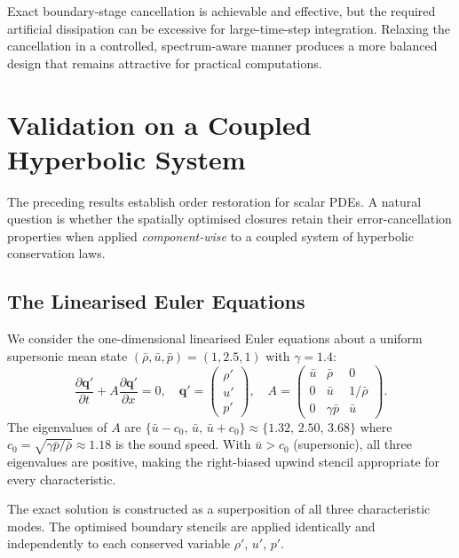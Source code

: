 \documentclass[review,hidelinks,onefignum,onetabnum]{siamart251216}
\begin{document}
Exact boundary-stage cancellation is achievable and effective, but the required artificial dissipation can be excessive for large-time-step integration. Relaxing the cancellation in a controlled, spectrum-aware manner produces a more balanced design that remains attractive for practical computations.

\section{Validation on a Coupled Hyperbolic System} \label{sec:euler}

The preceding results establish order restoration for scalar PDEs. A natural question is whether the spatially optimised closures retain their error-cancellation properties when applied \emph{component-wise} to a coupled system of hyperbolic conservation laws.

\subsection{The Linearised Euler Equations}

We consider the one-dimensional linearised Euler equations about a uniform supersonic mean state $(\bar{\rho}, \bar{u}, \bar{p}) = (1, 2.5, 1)$ with $\gamma = 1.4$:
\begin{equation} \label{eq:euler}
    \frac{\partial \mathbf{q}'}{\partial t} + A \frac{\partial \mathbf{q}'}{\partial x} = 0, \quad
    \mathbf{q}' = \begin{pmatrix} \rho' \\ u' \\ p' \end{pmatrix}, \quad
    A = \begin{pmatrix}
        \bar{u} & \bar{\rho} & 0 \\
        0 & \bar{u} & 1/\bar{\rho} \\
        0 & \gamma \bar{p} & \bar{u}
    \end{pmatrix}.
\end{equation}
The eigenvalues of $A$ are $\{\bar{u} - c_0,\, \bar{u},\, \bar{u} + c_0\} \approx \{1.32,\, 2.50,\, 3.68\}$ where $c_0 = \sqrt{\gamma \bar{p}/\bar{\rho}} \approx 1.18$ is the sound speed. With $\bar{u} > c_0$ (supersonic), all three eigenvalues are positive, making the right-biased upwind stencil appropriate for every characteristic.

The exact solution is constructed as a superposition of all three characteristic modes. The optimised boundary stencils are applied identically and independently to each conserved variable $\rho'$, $u'$, $p'$.
\end{document}
